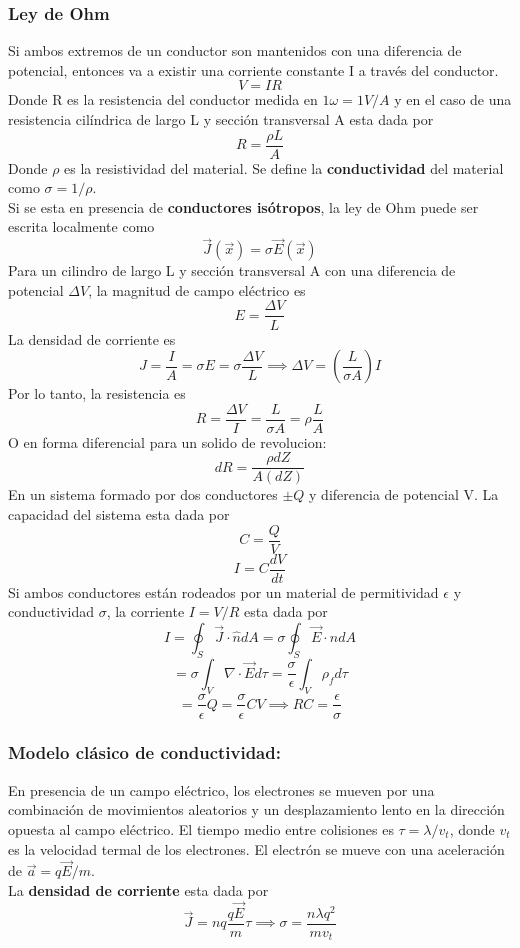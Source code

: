 \documentclass[a4paper, 10pt]{article}
\begin{document}
\begin{multicols*}{2}
	\subsubsection{Ley de Ohm}
	Si ambos extremos de un conductor son mantenidos con una diferencia de potencial, entonces va a existir una corriente constante I a través del conductor.
	$$V = IR$$
	Donde R es la resistencia del conductor medida en $1 \omega = 1 V/A$ y en el caso de una resistencia cilíndrica de largo L y sección transversal A esta dada por 
	$$R=\frac{\rho L}{A}$$
	Donde $\rho$ es la resistividad del material.
	Se define la \textbf{conductividad }del material como $\sigma=1/\rho$.\\
	Si se esta en presencia de \textbf{conductores isótropos}, la ley de Ohm puede ser escrita localmente como 
  $$\vec{J}(\vec{x})=\sigma\vec{E}(\vec{x})$$
	Para un cilindro de largo L y sección transversal A con una diferencia de potencial $\Delta V$, la magnitud de campo eléctrico es
	$$E=\frac{\Delta V}{L}$$
	La densidad de corriente es
	$$J= \frac{I}{A}=\sigma E=\sigma \frac{\Delta V}{L }\implies \Delta V = (\frac{L}{\sigma A})I$$
	Por lo tanto, la resistencia es
	$$R=\frac{\Delta V}{I}=\frac{L}{\sigma A}=\rho \frac{L}{A}$$
  O en forma diferencial para un solido de revolucion:
  \begin{equation}
    dR = \frac{\rho dZ}{A(dZ)} 
  \end{equation}
	En un sistema formado por dos conductores $\pm Q$ y diferencia de potencial V. La capacidad del sistema esta dada por 
	$$C=\frac{Q}{V}$$
  \begin{equation}
    I = C \frac{dV}{dt}
  \end{equation}
	Si ambos conductores están rodeados por un material de permitividad $\epsilon$ y conductividad $\sigma$, la corriente $I=V/R$ esta dada por
	$$I = \oint_S \vec{J} \cdot \hat{n} dA = \sigma \oint_S \vec{E} \cdot \hat{n} dA$$
	$$= \sigma \int_V \nabla \cdot \vec{E} d \tau = \frac{\sigma}{\epsilon} \int_V \rho_f d\tau$$
	$$= \frac{\sigma}{\epsilon}Q=\frac{\sigma}{\epsilon} CV \implies RC=\frac{\epsilon}{\sigma}$$

	\subsubsection{Modelo clásico de conductividad: }En presencia de un campo eléctrico, los electrones se mueven por una combinación de movimientos aleatorios y un desplazamiento lento en la dirección opuesta al campo eléctrico.
	El tiempo medio entre colisiones es $\tau =\lambda / v_t$, donde $v_t $ es la velocidad termal de los electrones. El electrón se mueve con una aceleración de $\vec{a}=q\vec{E}/m$.\\
	La \textbf{densidad de corriente} esta dada por
	$$\vec{J} = nq \frac{q \vec{E}}{m}\tau \implies \sigma = \frac{n \lambda q^2}{m v_t}$$
	    

\end{multicols*}
\end{document}
